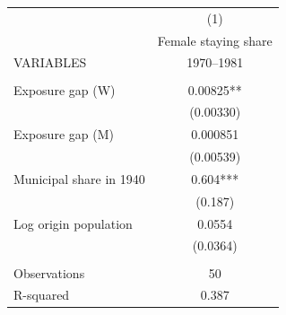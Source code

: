 \begin{tabular}{lc} \hline
 & (1) \\
 & Female staying share \\
VARIABLES & 1970--1981 \\ \hline
 &  \\
Exposure gap (W) & 0.00825** \\
 & (0.00330) \\
Exposure gap (M) & 0.000851 \\
 & (0.00539) \\
Municipal share in 1940 & 0.604*** \\
 & (0.187) \\
Log origin population & 0.0554 \\
 & (0.0364) \\
 &  \\
Observations & 50 \\
 R-squared & 0.387 \\ \hline
\end{tabular}
